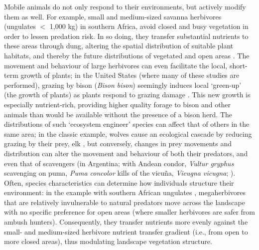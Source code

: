 Mobile animals do not only respond to their environments, but actively modify them as well.
For example, small and medium-sized savanna herbivores (ungulates $<$ 1,000 kg) in southern Africa, avoid closed and busy vegetation in order to lessen predation risk.
In so doing, they transfer substantial nutrients to these areas through dung, altering the spatial distribution of suitable plant habitats, and thereby the future distributions of vegetated and open areas \parencite{leroux2018}.
The movement and behaviour of large herbivores can even facilitate the local, short-term growth of plants; in the United States (where many of these studies are performed), grazing by bison (\emph{Bison bison}) seemingly induces local `green-up' (the growth of plants) as plants respond to grazing damage \parencite{geremia2019}.
This new growth is especially nutrient-rich, providing higher quality forage to bison and other animals than would be available without the presence of a bison herd.
The distributions of such `ecosystem engineer' species can affect that of others in the same area; in the classic example, wolves cause an ecological cascade by reducing grazing by their prey, elk \parencite{fortin2005}, but conversely, changes in prey movements and distribution can alter the movement and behaviour of both their predators, and even that of scavengers (in Argentina; with Andean condor, \emph{Vultur gryphus} scavenging on puma, \emph{Puma concolor} kills of the vicu{\~n}a, \emph{Vicugna vicugna}; \cite{monk2022}).
Often, species characteristics can determine how individuals structure their environment: in the example with southern African ungulates \parencite{leroux2018}, megaherbivores that are relatively invulnerable to natural predators move across the landscape with no specific preference for open areas (where smaller herbivores are safer from ambush hunters).
Consequently, they transfer nutrients more evenly against the small- and medium-sized herbivore nutrient transfer gradient (i.e., from open to more closed areas), thus modulating landscape vegetation structure.

